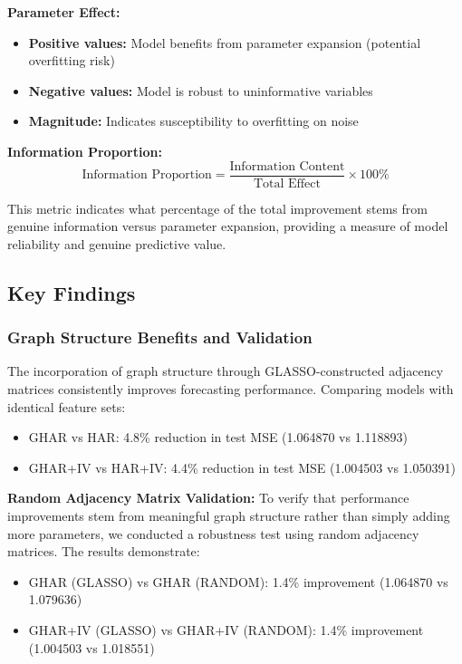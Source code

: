 \documentclass[12pt,a4paper]{article}
\begin{document}
\textbf{Parameter Effect:}
\begin{itemize}
\item \textbf{Positive values:} Model benefits from parameter expansion (potential overfitting risk)
\item \textbf{Negative values:} Model is robust to uninformative variables
\item \textbf{Magnitude:} Indicates susceptibility to overfitting on noise
\end{itemize}

\textbf{Information Proportion:}
$$\text{Information Proportion} = \frac{\text{Information Content}}{\text{Total Effect}} \times 100\%$$

This metric indicates what percentage of the total improvement stems from genuine information versus parameter expansion, providing a measure of model reliability and genuine predictive value.


\subsection{Key Findings}

\subsubsection{Graph Structure Benefits and Validation}

The incorporation of graph structure through GLASSO-constructed adjacency matrices consistently improves forecasting performance. Comparing models with identical feature sets:

\begin{itemize}
\item GHAR vs HAR: 4.8\% reduction in test MSE (1.064870 vs 1.118893)
\item GHAR+IV vs HAR+IV: 4.4\% reduction in test MSE (1.004503 vs 1.050391)
\end{itemize}

\textbf{Random Adjacency Matrix Validation:} To verify that performance improvements stem from meaningful graph structure rather than simply adding more parameters, we conducted a robustness test using random adjacency matrices. The results demonstrate:

\begin{itemize}
\item GHAR (GLASSO) vs GHAR (RANDOM): 1.4\% improvement (1.064870 vs 1.079636)
\item GHAR+IV (GLASSO) vs GHAR+IV (RANDOM): 1.4\% improvement (1.004503 vs 1.018551)
\end{itemize}
\end{document}
